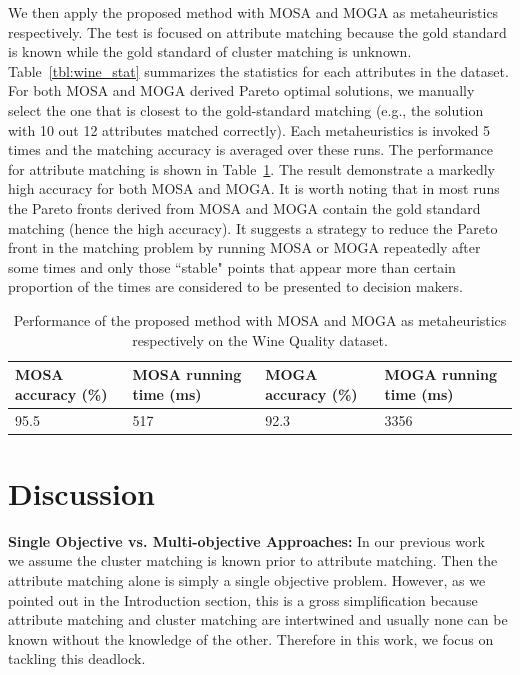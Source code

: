 We then apply the proposed method with MOSA and MOGA as metaheuristics respectively. The test is focused on attribute matching because the gold standard is known while the gold standard of cluster matching is unknown. Table~\ref{tbl:wine_stat} summarizes the statistics for each attributes in the dataset. For both MOSA and MOGA derived Pareto optimal solutions, we manually select the one that is closest to the gold-standard matching (e.g., the solution with 10 out 12 attributes matched correctly). Each metaheuristics is invoked 5 times and the matching accuracy is averaged over these runs. The performance for attribute matching is shown in Table~\ref{tbl:wine_res}. The result demonstrate a markedly high accuracy for both MOSA and MOGA. It is worth noting that in most runs the Pareto fronts derived from MOSA and MOGA contain the gold standard matching (hence the high accuracy). It suggests a strategy to reduce the Pareto front in the matching problem by running MOSA or MOGA repeatedly after some times and only those ``stable" points that appear more than certain proportion of the times are considered to be presented to decision makers.

\begin{table}[tbh]
\begin{center}
\begin{tabular}{l|l|l|l}
\hline
MOSA accuracy (\%)	&	MOSA running time (ms)	&	MOGA accuracy (\%)	&	MOGA running time (ms)	\\
\hline
95.5	&	517	&	92.3	&	3356	\\
\hline
\end{tabular}
\end{center}
\caption{\label{tbl:wine_res} Performance of the proposed method with MOSA and MOGA as metaheuristics respectively on the Wine Quality dataset.}
\end{table}


\section{Discussion}
\label{sec:discussion}
\textbf{Single Objective vs. Multi-objective Approaches:}
In our previous work~\cite{LiuEtal10,LiuEtalNEUCOM12} we assume the cluster matching is known prior to attribute matching. Then the attribute matching alone is simply a single objective problem. However, as we pointed out in the Introduction section, this is a gross simplification because attribute matching and cluster matching are intertwined and usually none can be known without the knowledge of the other. Therefore in this work, we focus on tackling this deadlock.

